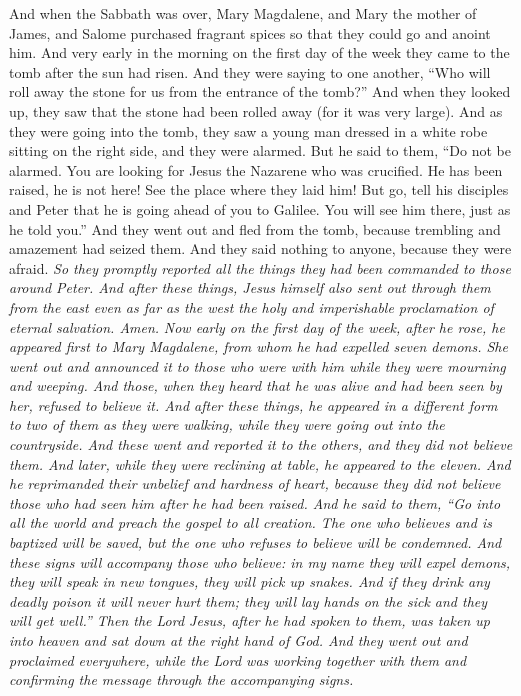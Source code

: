 \begin{biblechapter} %
 And when the Sabbath was over, Mary Magdalene, and Mary the mother of James, and Salome purchased fragrant spices so that they could go and anoint him.
\verse And very early in the morning on the first day of the week they came to the tomb after the sun had risen.
\verse And they were saying to one another, “Who will roll away the stone for us from the entrance of the tomb?”
\verse And when they looked up, they saw that the stone had been rolled away (for it was very large).
\verse And as they were going into the tomb, they saw a young man dressed in a white robe sitting on the right side, and they were alarmed.
\verse But he said to them, “Do not be alarmed. You are looking for Jesus the Nazarene who was crucified. He has been raised, he is not here! See the place where they laid him!
\verse But go, tell his disciples and Peter that he is going ahead of you to Galilee. You will see him there, just as he told you.”
\verse And they went out and fled from the tomb, because trembling and amazement had seized them. And they said nothing to anyone, because they were afraid. \textit{So they promptly reported all the things they had been commanded to those around Peter. And after these things, Jesus himself also sent out through them from the east even as far as the west the holy and imperishable proclamation of eternal salvation. Amen.}
 \textit{Now early on the first day of the week, after he rose, he appeared first to Mary Magdalene, from whom he had expelled seven demons.
\verse She went out and announced it to those who were with him while they were mourning and weeping.
\verse And those, when they heard that he was alive and had been seen by her, refused to believe it.
\verse And after these things, he appeared in a different form to two of them as they were walking, while they were going out into the countryside.
\verse And these went and reported it to the others, and they did not believe them.
\verse And later, while they were reclining at table, he appeared to the eleven. And he reprimanded their unbelief and hardness of heart, because they did not believe those who had seen him after he had been raised.
\verse And he said to them, “Go into all the world and preach the gospel to all creation.
\verse The one who believes and is baptized will be saved, but the one who refuses to believe will be condemned.
\verse And these signs will accompany those who believe: in my name they will expel demons, they will speak in new tongues,
\verse they will pick up snakes. And if they drink any deadly poison it will never hurt them; they will lay hands on the sick and \textit{they will get} well.”
\verse Then the Lord Jesus, after he had spoken to them, was taken up into heaven and sat down at the right hand of God.
\verse And they went out and proclaimed everywhere, while the Lord was working together with them and confirming the message through the accompanying signs.}
\end{biblechapter}

